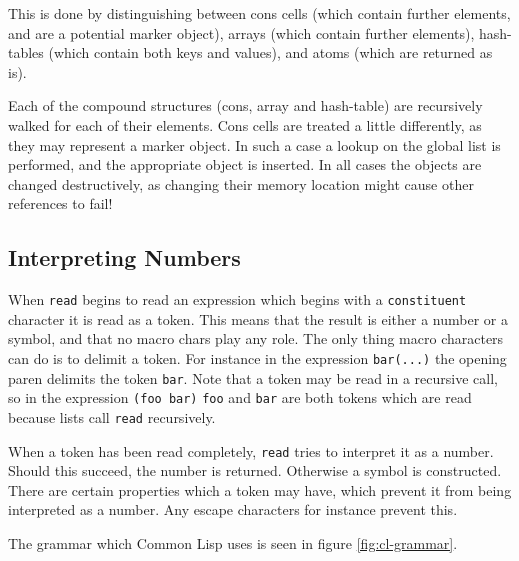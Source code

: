 \documentclass[a4paper,10pt,twoside]{report}
\newcommand{\cl}{Common Lisp}
\newcommand{\fun}[1]{\texttt{#1}}
\newcommand{\Read}{\fun{read}}
\begin{document}
This is done by distinguishing between cons cells (which contain further
elements, and are a potential marker object), arrays (which contain further
elements), hash-tables (which contain both keys and values), and atoms (which
are returned as is).

Each of the compound structures (cons, array and hash-table) are recursively
walked for each of their elements.  Cons cells are treated a little differently,
as they may represent a marker object.  In such a case a lookup on the global
list is performed, and the appropriate object is inserted.  In all cases the
objects are changed destructively, as changing their memory location might cause
other references to fail!

\subsection{Interpreting Numbers}
\label{subsec:interpreting-numbers}

When \Read{} begins to read an expression which begins with a
\texttt{constituent} character it is read as a token.  This means that the
result is either a number or a symbol, and that no macro chars play any role.
The only thing macro characters can do is to delimit a token.  For instance in
the expression \texttt{bar(...)} the opening paren delimits the token
\texttt{bar}.  Note that a token may be read in a recursive call, so in the
expression \texttt{(foo bar)} \texttt{foo} and \texttt{bar} are both tokens
which are read because lists call \Read{} recursively.

When a token has been read completely, \Read{} tries to interpret it as a
number.  Should this succeed, the number is returned.  Otherwise a symbol is
constructed.  There are certain properties which a token may have, which prevent
it from being interpreted as a number.  Any escape characters for instance
prevent this.

The grammar which \cl{} uses is seen in figure \ref{fig:cl-grammar}.
\end{document}
